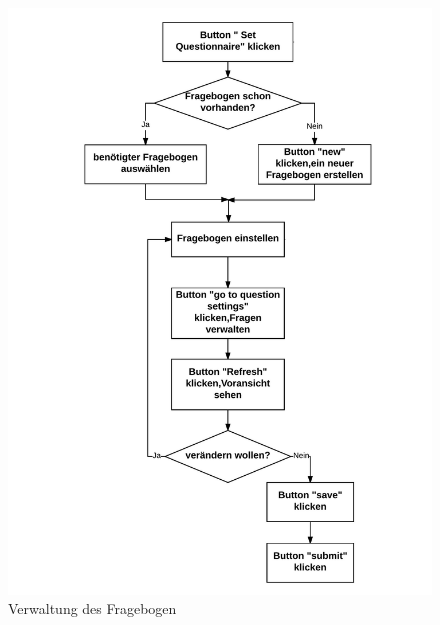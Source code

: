 \documentclass[a4paper]{scrreprt}
\begin{document}
\begin{itemize}
\begin{figure}[H]
                    \includegraphics[scale=0.75]{FragebogenVerwaltung.jpeg}
                    \caption{Verwaltung des Fragebogen}
                \end{figure}


\end{itemize}
\end{document}
